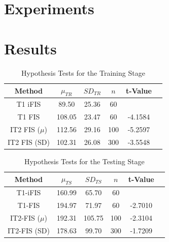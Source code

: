 \documentclass[conference]{IEEEtran}
\begin{document}
\section{Experiments}


\section{Results}

\begin{table}[!t]
  \renewcommand{\arraystretch}{1.3}
  \caption{Hypothesis Tests for the Training Stage}
  \label{hypothesis-tests-training}
  \centering
  \begin{tabular}{|c|c|c|c|c|c|}
    \hline
    Method & $\mu_{TR}$ & $SD_{TR}$ & $n$ & t-Value\\
    \hline
    T1 iFIS & 89.50 & 25.36 & 60 & \\
    \hline
    T1 FIS & 108.05 & 23.47 & 60 & -4.1584 \\
    \hline
    IT2 FIS (\(\mu\)) & 112.56 & 29.16 & 100 & -5.2597 \\
    \hline
    IT2 FIS (SD) & 102.31 & 26.08 & 300 & -3.5548 \\
    \hline
  \end{tabular}
\end{table}

\begin{table}[!t]
  \renewcommand{\arraystretch}{1.3}
  \caption{Hypothesis Tests for the Testing Stage}
  \label{hypothesis-tests}
  \centering
  \begin{tabular}{|c|c|c|c|c|c|}
    \hline
    Method & $\mu_{TS}$ & $SD_{TS}$ & $n$ & t-Value\\
    \hline
    T1-iFIS & 160.99 & 65.70 & 60 & \\
    \hline
    T1-FIS & 194.97 & 71.97 & 60 & -2.7010 \\
    \hline
    IT2-FIS (\(\mu\)) & 192.31 & 105.75 & 100 & -2.3104 \\
    \hline
    IT2-FIS (SD) & 178.63 & 99.70 & 300 & -1.7209 \\
    \hline
  \end{tabular}
\end{table}
\end{document}
